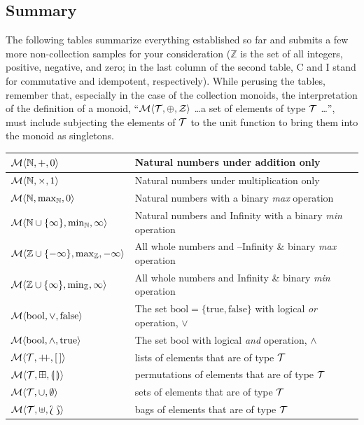 \subsection{\color{red}Summary}


The following tables summarize everything established so far and submits a few more non-collection samples for your consideration ($\mathbb{Z}$ is the set of all integers, positive, negative, and zero; in the last column of the second table, C and I stand for commutative and idempotent, respectively). While perusing the tables, remember that, especially in the case of the collection monoids, the interpretation of the definition of a monoid, ``$\mathcal{M}\langle{\mathcal{T}},{\oplus},{\mathcal{Z}}\rangle$ \ldots a set of elements of type $\mathcal{T}$ \ldots'', must include subjecting the elements of $\mathcal{T}$ to the unit function to bring them into the monoid as singletons.


\begin{center}
\begin{tabular}{|l|l|}
  \hline
  $\mathcal{M}\langle{\mathbb{N}},{+},{0}\rangle$ & Natural numbers under addition only \\ \hline
  $\mathcal{M}\langle{\mathbb{N}},{\times},{1}\rangle$ & Natural numbers under multiplication only \\ \hline
  $\mathcal{M}\langle{\mathbb{N}},{\max_{\mathbb{N}}},{0}\rangle$ & Natural numbers with a binary \emph{max} operation \\ \hline
  $\mathcal{M}\langle{\mathbb{N}\cup\{\infty\}},{\min_{\mathbb{N}}},{\infty}\rangle$ & Natural numbers and Infinity with a binary \emph{min} operation \\ \hline
  $\mathcal{M}\langle{\mathbb{Z}\cup\{-\infty\}},{\max_{\mathbb{Z}}},{-\infty}\rangle$ & All whole numbers and
  --Infinity \& binary \emph{max} operation \\ \hline
  $\mathcal{M}\langle{\mathbb{Z}\cup\{\infty\}},{\min_{\mathbb{Z}}},{\infty}\rangle$ & All whole numbers and
  Infinity \& binary \emph{min} operation \\ \hline
  $\mathcal{M}\langle{\mathrm{bool}},{\lor},{\mathrm{false}}\rangle$ &
  The set $\mathrm{bool}=\{\mathrm{true},\mathrm{false}\}$ with logical \emph{or} operation, $\lor$\\ \hline
  $\mathcal{M}\langle{\mathrm{bool}},{\land},{\mathrm{true}}\rangle$ &
  The set bool with logical \emph{and} operation, $\land$ \\ \hline
	\hline
  $\Mon{\T}{\pp}{\emptylist}$ & lists of elements that are of type $\mathcal{T}$ \\ \hline
  $\mathcal{M}\langle{\mathcal{T}},{\boxplus},{\llparenthesis\,\rrparenthesis}\rangle$ & permutations of elements that are of type $\mathcal{T}$ \\ \hline
  $\mathcal{M}\langle{\mathcal{T}},{\cup},{\emptyset}\rangle$ & sets of elements that are of type $\mathcal{T}$ \\ \hline
  $\mathcal{M}\langle{\mathcal{T}},{\uplus},{\Lbag\,\Rbag}\rangle$ & bags of elements that are of type $\mathcal{T}$ \\ \hline
\end{tabular}
\end{center}


